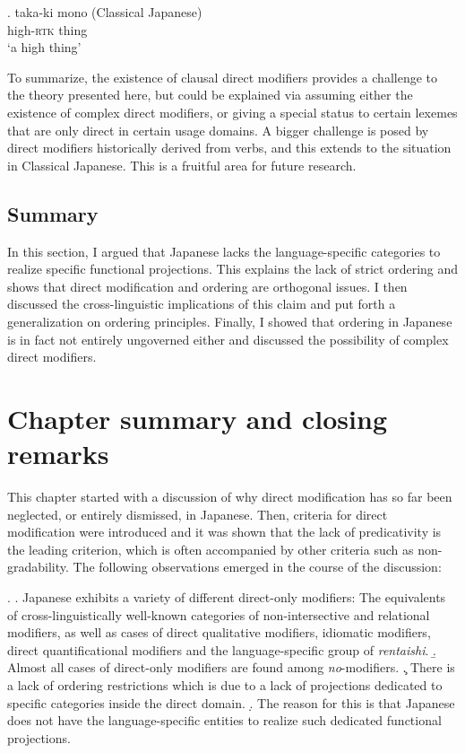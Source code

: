 \exg. taka-ki mono (Classical Japanese)\\
high-\textsc{rtk} thing\\
`a high thing' \null \hfill

To summarize, the existence of clausal direct modifiers provides a challenge to the theory presented here, but could be explained via assuming either the existence of complex direct modifiers, or giving a special status to certain lexemes that are only direct in certain usage domains. A bigger challenge is posed by direct modifiers historically derived from verbs, and this extends to the situation in Classical Japanese. This is a fruitful area for future research.

\subsection{Summary}

In this section, I argued that Japanese lacks the language-specific categories to realize specific functional projections. This explains the lack of strict ordering and shows that direct modification and ordering are orthogonal issues. I then discussed the cross-linguistic implications of this claim and put forth a generalization on ordering principles. Finally, I showed that ordering in Japanese is in fact not entirely ungoverned either and discussed the possibility of complex direct modifiers.

\section{Chapter summary and closing remarks}

This chapter started with a discussion of why direct modification has so far been neglected, or entirely dismissed, in Japanese. Then, criteria for direct modification were introduced and it was shown that the lack of predicativity is the leading criterion, which is often accompanied by other criteria such as non-gradability. The following observations emerged in the course of the discussion:

\ex. \a. Japanese exhibits a variety of different direct-only modifiers: The equivalents of cross-linguistically well-known categories of non-intersective and relational modifiers, as well as cases of direct qualitative modifiers, idiomatic modifiers, direct quantificational modifiers and the language-specific group of \textit{rentaishi}.
\b. Almost all cases of direct-only modifiers are found among \textit{no}-modifiers.
\c. There is a lack of ordering restrictions which is due to a lack of projections dedicated to specific categories inside the direct domain.
\d. The reason for this is that Japanese does not have the language-specific entities to realize such dedicated functional projections.

